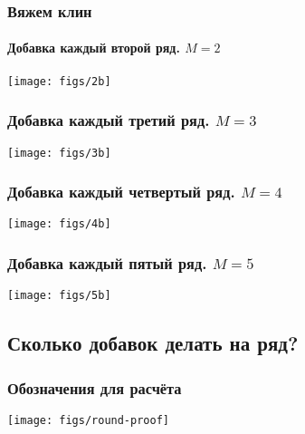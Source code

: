 \begin{frame}
    \frametitle{Вяжем клин}
    \framesubtitle{Добавка каждый второй ряд. $M=2$}

    \begin{center}
        \texttt{[image: figs/2b]}
    \end{center}
\end{frame}

\begin{frame}
    \frametitle{Добавка каждый \alert{третий} ряд. $M=3$}

    \begin{center}
        \texttt{[image: figs/3b]}
    \end{center}
\end{frame}

\begin{frame}
    \frametitle{Добавка каждый \alert{четвертый} ряд. $M=4$}

    \begin{center}
        \texttt{[image: figs/4b]}
    \end{center}
\end{frame}

\begin{frame}
    \frametitle{Добавка каждый \alert{пятый} ряд. $M=5$}

    \begin{center}
        \texttt{[image: figs/5b]}
    \end{center}
\end{frame}


\subsection{Сколько добавок делать на ряд?}

\begin{frame}
    \frametitle{Обозначения для расчёта}

    \begin{center}
        \texttt{[image: figs/round-proof]}
    \end{center}
\end{frame}

